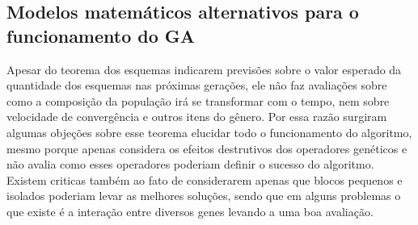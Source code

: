 %
%

%

\subsection{Modelos matemáticos alternativos para o funcionamento do GA}
Apesar do teorema dos esquemas indicarem previsões sobre o valor esperado da quantidade dos esquemas nas próximas gerações, ele não faz avaliações sobre como a composição da população irá se transformar com o tempo, nem sobre velocidade de convergência e outros itens do gênero. Por essa razão surgiram algumas objeções sobre esse teorema elucidar todo o funcionamento do algoritmo, mesmo porque apenas considera os efeitos destrutivos dos operadores genéticos e não avalia como esses operadores poderiam definir o sucesso do algoritmo. Existem criticas também ao fato de considerarem apenas que blocos pequenos e isolados poderiam levar as melhores soluções, sendo que em alguns problemas o que existe é a interação entre diversos genes levando a uma boa avaliação.

